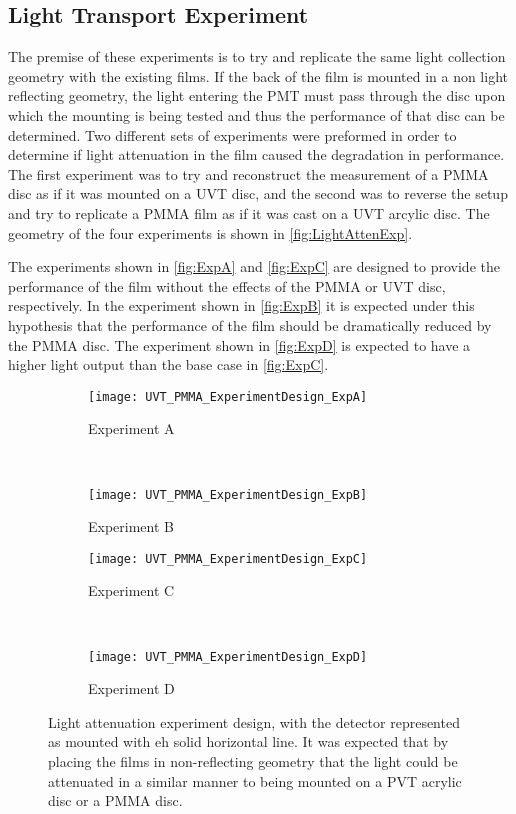 \documentclass[draftcls,onecolumn]{IEEEtran}
\begin{document}
\subsection{Light Transport Experiment}
The premise of these experiments is to try and replicate the same light collection geometry with the existing films.
If the back of the film is mounted in a non light reflecting geometry, the light entering the PMT must pass through the disc upon which the mounting is being tested and thus the performance of that disc can be determined.
Two different sets of experiments were preformed in order to determine if light attenuation in the film caused the degradation in performance.
The first experiment was to try and reconstruct the measurement of a PMMA disc as if it was mounted on a UVT disc, and the second was to reverse the setup and try to replicate a PMMA film as if it was cast on a UVT arcylic disc.
The geometry of the four experiments is shown in \autoref{fig:LightAttenExp}.

The experiments shown in \autoref{fig:ExpA} and \autoref{fig:ExpC} are designed to provide the performance of the film without the effects of the PMMA or UVT disc, respectively.
In the experiment shown in \autoref{fig:ExpB} it is expected under this hypothesis that the performance of the film should be dramatically reduced by the PMMA disc.
The experiment shown in \autoref{fig:ExpD} is expected to have a higher light output than the base case in \autoref{fig:ExpC}.
\begin{figure}
  \centering
  \begin{subfigure}[b]{0.45\textwidth}
    \centering
    \texttt{[image: UVT\_PMMA\_ExperimentDesign\_ExpA]}
    \caption{Experiment A}
    \label{fig:ExpA}
  \end{subfigure}%
  ~
  \begin{subfigure}[b]{0.45\textwidth}
    \centering
    \texttt{[image: UVT\_PMMA\_ExperimentDesign\_ExpB]}
    \caption{Experiment B}
    \label{fig:ExpB}
  \end{subfigure}%
  
  \begin{subfigure}[b]{0.45\textwidth}
    \centering
    \texttt{[image: UVT\_PMMA\_ExperimentDesign\_ExpC]}
    \caption{Experiment C}
    \label{fig:ExpC}
  \end{subfigure}%
  ~
  \begin{subfigure}[b]{0.45\textwidth}
    \centering
    \texttt{[image: UVT\_PMMA\_ExperimentDesign\_ExpD]}
    \caption{Experiment D}
    \label{fig:ExpD}
  \end{subfigure}
  \caption[Light Attenuation Experiment Design]{Light attenuation experiment design, with the detector represented as mounted with eh solid horizontal line. It was expected that by placing the films in non-reflecting geometry that the light could be attenuated in a similar manner to being mounted on a PVT acrylic disc or a PMMA disc.}
  \label{fig:LightAttenExp}
\end{figure}
\end{document}
